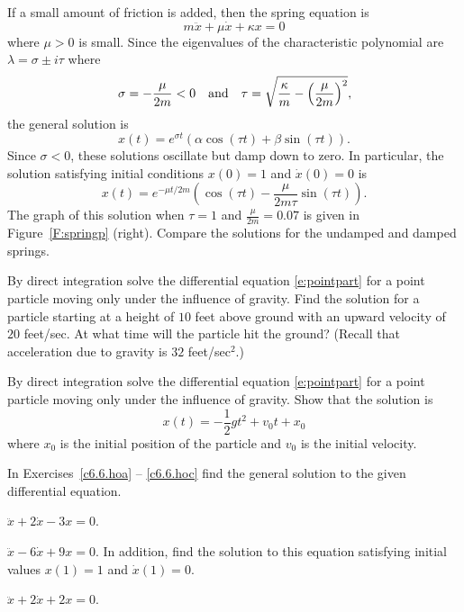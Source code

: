 \documentclass{ximera}
\begin{document}
If a small amount of friction is added, then the spring equation is
\[
m\ddot{x} + \mu \dot{x} +\kappa x = 0
\]
where $\mu>0$ is small.  Since the eigenvalues of the characteristic
polynomial are $\lambda=\sigma\pm i\tau$ where
\[
\sigma = -\frac{\mu}{2m} < 0 \quad\mbox{and}\quad \tau =\sqrt{\frac{\kappa}{m}
-\left(\frac{\mu}{2m}\right)^2},
\]
the general solution is
\[
x(t) = e^{\sigma t}(\alpha\cos(\tau t) + \beta\sin(\tau t)).
\]
Since $\sigma<0$, these solutions oscillate but damp down to zero.  In
particular, the solution satisfying initial conditions $x(0)=1$ and
$\dot{x}(0)=0$ is
\[
x(t) = e^{-\mu t/2m}
\left(\cos(\tau t)-\frac{\mu}{2m\tau}\sin(\tau t)\right).
\]
The graph of this solution when $\tau=1$ and $\frac{\mu}{2m}=0.07$ is
given in Figure~\ref{F:springp} (right).  Compare the solutions for the
undamped and damped springs.

\EXER

\TEXER

\begin{exercise} \label{c6.7.1}
By direct integration solve the differential equation \eqref{e:pointpart}
for a point particle moving only under the influence of gravity.  Find the
solution for a particle starting at a height of $10$ feet above ground with
an upward velocity of $20$ feet/sec.  At what time will the particle hit
the ground?  (Recall that acceleration due to gravity is $32$ feet/sec$^2$.)
\end{exercise}

\begin{exercise} \label{c6.7.2}
By direct integration solve the differential equation \eqref{e:pointpart}
for a point particle moving only under the influence of gravity.  Show
that the solution is
\[
x(t) = -\frac{1}{2}gt^2 + v_0t + x_0
\]
where $x_0$ is the initial position of the particle and $v_0$ is the initial
velocity.
\end{exercise}

\noindent  In Exercises~\ref{c6.6.hoa} -- \ref{c6.6.hoc} find the general
solution to the given differential equation.
\begin{exercise} \label{c6.6.hoa}
$\ddot{x} + 2\dot{x} - 3x = 0$.
\end{exercise}
\begin{exercise} \label{c6.6.hob}
$\ddot{x} - 6\dot{x} + 9x = 0$.
In addition, find the solution to this equation satisfying
initial values $x(1)=1$ and $\dot{x}(1)=0$.
\end{exercise}
\begin{exercise} \label{c6.6.hoc}
$\ddot{x} + 2\dot{x} + 2x = 0$.
\end{exercise}
\end{document}
